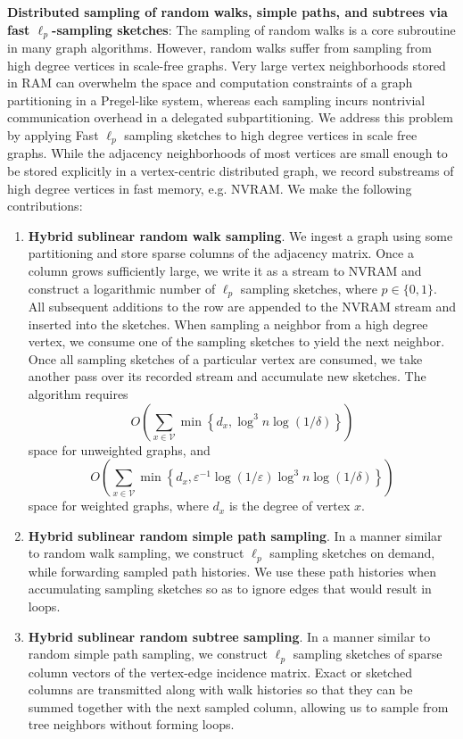 \documentclass{report}
\begin{document}
\noindent
\textbf{Distributed sampling of random walks, simple paths, and subtrees via fast $\ell_p$-sampling sketches}:
The sampling of random walks is a core subroutine in many graph algorithms.
However, random walks suffer from sampling from high degree vertices in scale-free graphs. 
Very large vertex neighborhoods stored in RAM can overwhelm the space and computation constraints of a graph partitioning in a Pregel-like system, whereas each sampling incurs nontrivial communication overhead in a delegated subpartitioning. 
We address this problem by applying Fast $\ell_p$ sampling sketches to high degree vertices in scale free graphs. 
While the adjacency neighborhoods of most vertices are small enough to be stored explicitly in a vertex-centric distributed graph, we record substreams of high degree vertices in fast memory, e.g. NVRAM. 
We make the following contributions:
%
\begin{enumerate}
	\item \textbf{Hybrid sublinear random walk sampling}. 
	We ingest a graph using some partitioning and store sparse columns of the adjacency matrix. 
	Once a column grows sufficiently large, we write it as a stream to NVRAM and construct a logarithmic number of $\ell_p$ sampling sketches, where $p \in \{0,1\}$. 
	All subsequent additions to the row are appended to the NVRAM stream and inserted into the sketches. 
	When sampling a neighbor from a high degree vertex, we consume one of the sampling sketches to yield the next neighbor.
	Once all sampling sketches of a particular vertex are consumed, we take another pass over its recorded stream and accumulate new sketches.
	The algorithm requires
	\begin{equation*}
	O\left ( \sum_{x \in \mathcal{V}} \min \left \{ d_x, \log^3 n \log (1/\delta) \right \} \right )
	\end{equation*}
	space for unweighted graphs, and 
	\begin{equation*}
	O \left ( \sum_{x \in \mathcal{V}} \min \left \{ d_x, \varepsilon^{-1} \log (1 / \varepsilon) \log^3 n \log (1/\delta) \right \} \right )
	\end{equation*}
	space for weighted graphs, where $d_x$ is the degree of vertex $x$.
	\item \textbf{Hybrid sublinear random simple path sampling}.
	In a manner similar to random walk sampling, we construct $\ell_p$ sampling sketches on demand, while forwarding sampled path histories.
	We use these path histories when accumulating sampling sketches so as to ignore edges that would result in loops.
	\item \textbf{Hybrid sublinear random subtree sampling}.
	In a manner similar to random simple path sampling, we construct $\ell_p$ sampling sketches of sparse column vectors of the vertex-edge incidence matrix. 
	Exact or sketched columns are transmitted along with walk histories so that they can be summed together with the next sampled column, allowing us to sample from tree neighbors without forming loops.
\end{enumerate}
%
\end{document}
